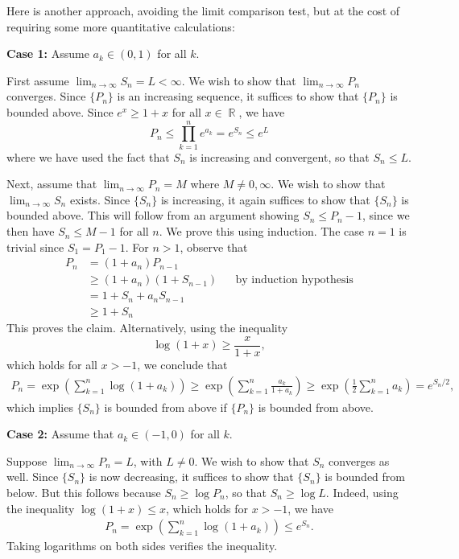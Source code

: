 \documentclass{exam}
\DeclareMathOperator{\RR}{\mathbb{R}}
\theoremstyle{problemstyle}
\newcommand{\1}[1]{\textbf{1}_{\left[#1\right]}} %
\def\({\left (}
\def\){\right )}
\begin{document}
\begin{questions}
\begin{parts}
\begin{solution}
  	Here is another approach, avoiding the limit comparison test, but at the cost of requiring some more quantitative calculations:

  \textbf{Case 1:} Assume $a_k \in (0,1)$ for all $k$.

  First assume $\lim_{n\to\infty} S_n = L <\infty$. We wish to show that $\lim_{n\to\infty} P_n$ converges. Since $\{ P_n \}$ is an increasing sequence, it suffices to show that $\{ P_n \}$ is bounded above. Since $e^x\geq 1+x$ for all $x \in \RR$, we have
  \begin{equation*}
  P_n \leq \prod_{k=1}^n e^{a_k} = e^{S_n} \leq e^L
  \end{equation*}
  where we have used the fact that $S_n$ is increasing and convergent, so that $S_n \leq L$.
  
  Next, assume that $\lim_{n\to\infty} P_n = M$ where $M \neq 0,\infty$. We wish to show that $\lim_{n\to\infty} S_n$ exists. Since $\{ S_n \}$ is increasing, it again suffices to show that $\{ S_n \}$ is bounded above. This will follow from an argument showing $S_n \leq P_n - 1$, since we then have $S_n \leq M - 1$ for all $n$. We prove this using induction. The case $n=1$ is trivial since $S_1 = P_1 - 1$. For $n>1$, observe that
  \begin{align*}
  P_n 
  &= (1+a_n) P_{n-1}\\
  &\geq (1+a_n)(1+S_{n-1}) &&\text{by induction hypothesis}\\
  &= 1+ S_{n} + a_nS_{n-1}\\
  &\geq 1+S_n
  \end{align*}
  This proves the claim. Alternatively, using the inequality
  \[ \log(1+x)\geq \frac{x}{1+x}, \]
  which holds for all $x>-1$, we conclude that
  \begin{align*}
  P_n = \exp \(\sum_{k=1}^n \log(1+a_k)\) \geq \exp\(\sum_{k=1}^{n} \frac{a_k}{1+a_k} \)\geq \exp\(\frac{1}{2}\sum_{k=1}^n a_k\) = e^{S_n/2},
  \end{align*}
  which implies $\{ S_n \}$ is bounded from above if $\{ P_n \}$ is bounded from above.
  
  \textbf{Case 2:} Assume that $a_k\in (-1,0)$ for all $k$.

  Suppose $\lim_{n\to\infty} P_n = L$, with $L \neq 0$. We wish to show that $S_n$ converges as well. Since $\{ S_n \}$ is now decreasing, it suffices to show that $\{ S_n \}$ is bounded from below. But this follows because $S_n \geq \log P_n$, so that $S_n \geq \log L$. Indeed, using the inequality $\log(1+x)\leq x$, which holds for $x>-1$, we have
  \begin{align*}
  	P_n = \exp \left( \sum_{k=1}^n \log(1+a_k) \right) \leq e^{S_n}.
  \end{align*}
  Taking logarithms on both sides verifies the inequality.
  

\end{solution}
\end{parts}
\end{questions}
\end{document}
